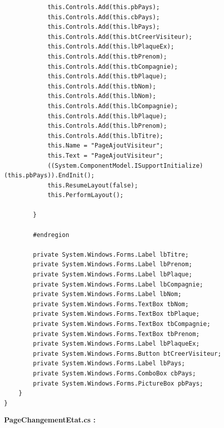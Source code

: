 \documentclass[main.tex]{subfiles}
\begin{document}
\begin{lstlisting}
            this.Controls.Add(this.pbPays);
            this.Controls.Add(this.cbPays);
            this.Controls.Add(this.lbPays);
            this.Controls.Add(this.btCreerVisiteur);
            this.Controls.Add(this.lbPlaqueEx);
            this.Controls.Add(this.tbPrenom);
            this.Controls.Add(this.tbCompagnie);
            this.Controls.Add(this.tbPlaque);
            this.Controls.Add(this.tbNom);
            this.Controls.Add(this.lbNom);
            this.Controls.Add(this.lbCompagnie);
            this.Controls.Add(this.lbPlaque);
            this.Controls.Add(this.lbPrenom);
            this.Controls.Add(this.lbTitre);
            this.Name = "PageAjoutVisiteur";
            this.Text = "PageAjoutVisiteur";
            ((System.ComponentModel.ISupportInitialize)(this.pbPays)).EndInit();
            this.ResumeLayout(false);
            this.PerformLayout();

        }

        #endregion

        private System.Windows.Forms.Label lbTitre;
        private System.Windows.Forms.Label lbPrenom;
        private System.Windows.Forms.Label lbPlaque;
        private System.Windows.Forms.Label lbCompagnie;
        private System.Windows.Forms.Label lbNom;
        private System.Windows.Forms.TextBox tbNom;
        private System.Windows.Forms.TextBox tbPlaque;
        private System.Windows.Forms.TextBox tbCompagnie;
        private System.Windows.Forms.TextBox tbPrenom;
        private System.Windows.Forms.Label lbPlaqueEx;
        private System.Windows.Forms.Button btCreerVisiteur;
        private System.Windows.Forms.Label lbPays;
        private System.Windows.Forms.ComboBox cbPays;
        private System.Windows.Forms.PictureBox pbPays;
    }
}
\end{lstlisting}


\textbf{PageChangementEtat.cs :}
\end{document}
